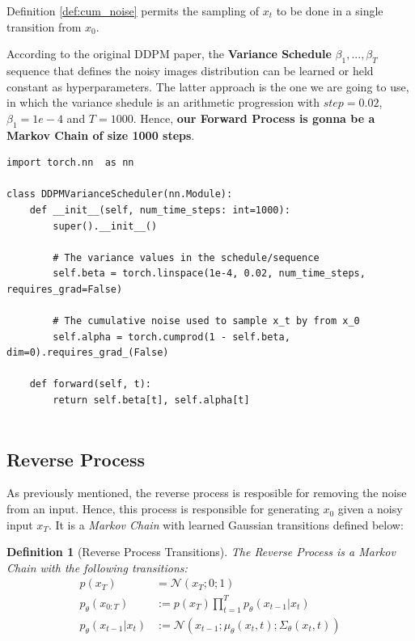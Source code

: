 \documentclass{article}
\newtheorem{definition}{Definition}[section]
\begin{document}
Definition \ref{def:cum_noise} permits the sampling of $x_t$ to be done in a single transition from $x_0$.

According to the original DDPM paper, the \textbf{Variance Schedule} $\beta_1, ..., \beta_T$ sequence that defines the noisy images distribution can be learned or held constant as hyperparameters. The latter approach is the one we are going to use, in which the variance shedule is an arithmetic progression with $step = 0.02$, $\beta_1 = 1e-4$ and $T=1000$.  Hence, \textbf{our Forward Process is gonna be a Markov Chain of size 1000 steps}.


\begin{lstlisting}[caption={Variance Schedule}]
import torch.nn  as nn

class DDPMVarianceScheduler(nn.Module):
	def __init__(self, num_time_steps: int=1000):
		super().__init__()
		
		# The variance values in the schedule/sequence
		self.beta = torch.linspace(1e-4, 0.02, num_time_steps, requires_grad=False)
		
		# The cumulative noise used to sample x_t by from x_0 
		self.alpha = torch.cumprod(1 - self.beta, dim=0).requires_grad_(False)

	def forward(self, t):
		return self.beta[t], self.alpha[t]
	
\end{lstlisting}

\subsection{Reverse  Process}

As previously mentioned, the reverse process is resposible for removing the noise from an input. Hence, this process is responsible for generating $x_0$ given a noisy input $x_T$. It is a \textit{Markov Chain} with learned Gaussian transitions defined below:


\begin{definition}[Reverse Process Transitions]
	The Reverse Process is a Markov Chain with the following transitions:
	\label{def:rev_process_trans}
	\begin{align}
		p(x_T) &= \mathcal{N}(x_T; 0; 1)\\
	    p_{\theta}(x_{0:T}) &:= p(x_T) \prod_{t=1}^{T} p_{\theta}(x_{t-1} | x_t) \\
	 	p_{\theta}(x_{t-1} | x_t) & := \mathcal{N}(x_{t-1}; \mu_\theta(x_t,t); \Sigma_\theta(x_t, t))
	\end{align}
\end{definition}
\end{document}
